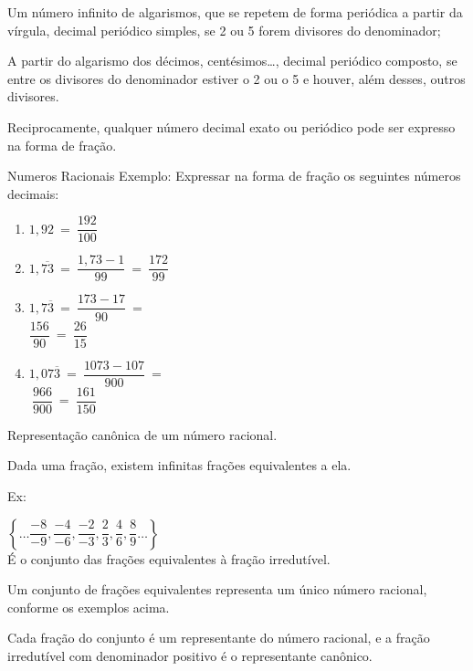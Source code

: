 \begin{multicols*}{2}
    Um número infinito de algarismos, que se repetem de forma periódica a partir da vírgula, decimal periódico simples, se 2 ou 5 forem divisores do denominador;

    A partir do algarismo dos décimos, centésimos…, decimal periódico composto, se entre os divisores do denominador estiver o 2 ou o 5 e houver, além desses, outros divisores.

    Reciprocamente, qualquer número decimal exato ou periódico pode ser expresso na forma de fração.

    Numeros Racionais
    Exemplo:
    Expressar na forma de fração os seguintes números decimais:

    \begin{enumerate}

        \item $1,92 \ = \ \dfrac{192}{100}$\\

        \item $1,\overline{73} \ = \ \dfrac{1,73 - 1}{99} \ = \ \dfrac{172}{99}$\\

        \item $1,7\overline{3} \ = \  \dfrac{173 - 17}{90} \ = \ $ \\ $ \dfrac{156}{90} \ = \ \dfrac{26}{15}$\\

        \item $1,07\overline{3} \ = \ \dfrac{1073 - 107}{900}\ = $\\ $ \ \dfrac{966}{900} \ = \ \dfrac{161}{150}$

    \end{enumerate}

    Representação canônica de um número racional.

    Dada uma fração, existem infinitas frações equivalentes a ela.

    Ex:

    $ \left\lbrace \dots \dfrac{-8}{-9}, \dfrac{-4}{-6}, \dfrac{-2}{-3}, \dfrac{2}{3}, \dfrac{4}{6},\dfrac{8}{9} \dots \right\rbrace $\\

    É o conjunto das frações equivalentes à fração irredutível.

    Um conjunto de frações equivalentes representa um único número racional, conforme os exemplos acima.

    Cada fração do conjunto é um representante do número racional, e a fração irredutível com denominador positivo é o representante canônico.


\end{multicols*}
